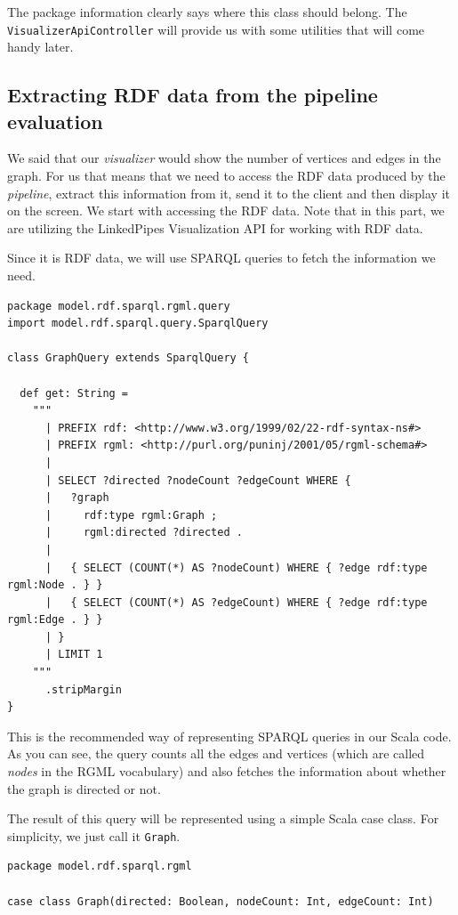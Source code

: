 The package information clearly says where this class should belong. The \texttt{VisualizerApiController} will provide us with some utilities that will come handy later.

\subsection{Extracting RDF data from the pipeline evaluation}
\label{sec:implementation:integrating-visualizer:extracting-rdf}

We said that our \emph{visualizer} would show the number of vertices and edges in the graph. For us that means that we need to access the RDF data produced by the \emph{pipeline}, extract this information from it, send it to the client and then display it on the screen. We start with accessing the RDF data. Note that in this part, we are utilizing the LinkedPipes Visualization API for working with RDF data.

Since it is RDF data, we will use SPARQL queries to fetch the information we need. 

\begin{verbatim}
package model.rdf.sparql.rgml.query
import model.rdf.sparql.query.SparqlQuery

class GraphQuery extends SparqlQuery {

  def get: String =
    """
      | PREFIX rdf: <http://www.w3.org/1999/02/22-rdf-syntax-ns#>
      | PREFIX rgml: <http://purl.org/puninj/2001/05/rgml-schema#>
      |
      | SELECT ?directed ?nodeCount ?edgeCount WHERE {
      |   ?graph
      |     rdf:type rgml:Graph ;
      |     rgml:directed ?directed .
      |
      |   { SELECT (COUNT(*) AS ?nodeCount) WHERE { ?edge rdf:type rgml:Node . } }
      |   { SELECT (COUNT(*) AS ?edgeCount) WHERE { ?edge rdf:type rgml:Edge . } }
      | }
      | LIMIT 1
    """
      .stripMargin
}
\end{verbatim}

This is the recommended way of representing SPARQL queries in our Scala code. As you can see, the query counts all the edges and vertices (which are called \emph{nodes} in the RGML vocabulary) and also fetches the information about whether the graph is directed or not.

The result of this query will be represented using a simple Scala case class. For simplicity, we just call it \texttt{Graph}.

\begin{verbatim}
package model.rdf.sparql.rgml

case class Graph(directed: Boolean, nodeCount: Int, edgeCount: Int)
\end{verbatim}

